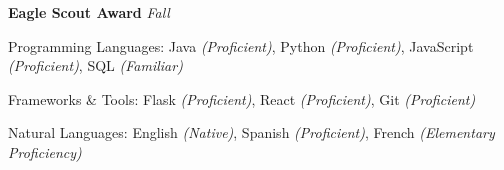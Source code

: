 \documentclass[10pt,letterpaper]{article}
\begin{document}
\headedsection
  {\textbf{Eagle Scout Award}}
  {\emph{Fall }}
  {}

\spacedhrule{0.5em}{-0.4em}


\inlineheadsection
  {Programming Languages:}
  {Java \emph{(Proficient)}, Python \emph{(Proficient)}, JavaScript \emph{(Proficient)}, SQL \emph{(Familiar)}}

\inlineheadsection
  {Frameworks \& Tools: }
  {Flask \emph{(Proficient)}, React \emph{(Proficient)}, Git \emph{(Proficient)}}

\inlineheadsection
  {Natural Languages:}
  {English \emph{(Native)}, Spanish \emph{(Proficient)}, French \emph{(Elementary Proficiency)}}
\end{document}
